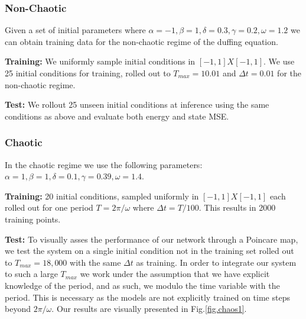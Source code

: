 \documentclass[twoside]{article}
\begin{document}
\subsubsection{Non-Chaotic}

Given a set of initial parameters where $\alpha =-1,\beta=1,\delta=0.3,\gamma=0.2,\omega=1.2$ we can obtain training data for the non-chaotic regime of the duffing equation. 

\textbf{Training:} We uniformly sample initial conditions in $[-1,1]X[-1,1]$. We use 25 initial conditions for training, rolled out to $T_{max}=10.01$ and $\Delta t =0.01$ for the non-chaotic regime. 

\textbf{Test:} We rollout 25 unseen initial conditions at inference using the same conditions as above and evaluate both energy and state MSE.



\subsubsection{Chaotic}

In the chaotic regime we use the following parameters:
$\alpha =1,\beta=1,\delta=0.1,\gamma=0.39,\omega=1.4$. 

\textbf{Training:} 20 initial conditions, sampled uniformly in $[-1,1]X[-1,1]$ each rolled out for one period $T=2\pi/\omega$ where $\Delta t = T/100$. This results in 2000 training points.

\textbf{Test:} To visually asses the performance of our network through a Poincare map, we test the system on a single initial condition not in the training set rolled out to $T_{max} = 18,000$ with the same $\Delta t$ as training. In order to integrate our system to such a large $T_{max}$ we work under the assumption that we have explicit knowledge of the period, and as such, we modulo the time variable with the period. This is necessary as the models are not explicitly trained on time steps beyond $2\pi/\omega$. Our results are visually presented in Fig.\ref{fig.chaos1}.  
\end{document}
